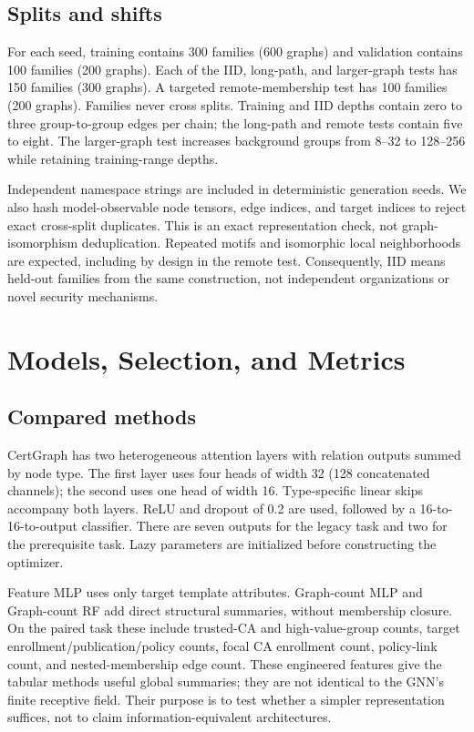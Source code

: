 \documentclass[journal]{IEEEtran}
\begin{document}
\subsection{Splits and shifts}
For each seed, training contains 300 families (600 graphs) and validation contains 100 families (200 graphs). Each of the IID, long-path, and larger-graph tests has 150 families (300 graphs). A targeted remote-membership test has 100 families (200 graphs). Families never cross splits. Training and IID depths contain zero to three group-to-group edges per chain; the long-path and remote tests contain five to eight. The larger-graph test increases background groups from 8--32 to 128--256 while retaining training-range depths.

Independent namespace strings are included in deterministic generation seeds. We also hash model-observable node tensors, edge indices, and target indices to reject exact cross-split duplicates. This is an exact representation check, not graph-isomorphism deduplication. Repeated motifs and isomorphic local neighborhoods are expected, including by design in the remote test. Consequently, IID means held-out families from the same construction, not independent organizations or novel security mechanisms.

\section{Models, Selection, and Metrics}
\subsection{Compared methods}
CertGraph has two heterogeneous attention layers with relation outputs summed by node type. The first layer uses four heads of width 32 (128 concatenated channels); the second uses one head of width 16. Type-specific linear skips accompany both layers. ReLU and dropout of 0.2 are used, followed by a 16-to-16-to-output classifier. There are seven outputs for the legacy task and two for the prerequisite task. Lazy parameters are initialized before constructing the optimizer.

Feature MLP uses only target template attributes. Graph-count MLP and Graph-count RF add direct structural summaries, without membership closure. On the paired task these include trusted-CA and high-value-group counts, target enrollment/publication/policy counts, focal CA enrollment count, policy-link count, and nested-membership edge count. These engineered features give the tabular methods useful global summaries; they are not identical to the GNN's finite receptive field. Their purpose is to test whether a simpler representation suffices, not to claim information-equivalent architectures.
\end{document}
